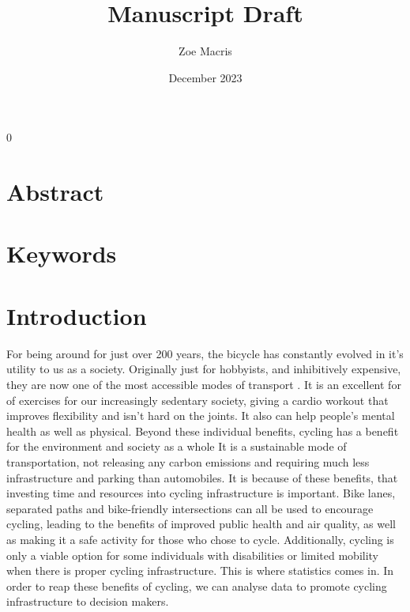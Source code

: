 \documentclass[12pt, letterpaper]{article}
\newcommand{\blind}{0}
\begin{document}

\blind
{
  \title{\bf Manuscript Draft}
  \author{Zoe Macris}
\date{December 2023}
  \maketitle} 


\section{Abstract}
\label{sec:abstract}



\section{Keywords}
\label{sec:keywords}


\section{Introduction}
\label{sec:intro}

For being around for just over 200 years, the bicycle has constantly evolved in it's utility to us as a society. Originally just for hobbyists, and inhibitively expensive, they are now one of the most accessible modes of transport \cite{BIKE2023}. It is an excellent for of exercises for our increasingly sedentary society, giving a cardio workout that improves flexibility and isn't hard on the joints. It also can help people's mental health as well as physical. Beyond these individual benefits, cycling has a benefit for the environment and society as a whole It is a sustainable mode of transportation, not releasing any carbon emissions and requiring much less infrastructure and parking than automobiles. It is because of these benefits, that investing time and resources into cycling infrastructure is important. Bike lanes, separated paths and bike-friendly intersections can all be used to encourage cycling, leading to the benefits of improved public health and air quality, as well as making it a safe activity for those who chose to cycle. Additionally, cycling is only a viable option for some individuals with disabilities or limited mobility when there is proper cycling infrastructure. This is where statistics comes in. In order to reap these benefits of cycling, we can analyse data to promote cycling infrastructure to decision makers.
\end{document}
